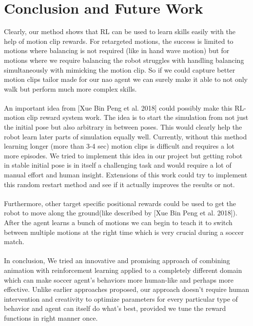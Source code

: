 \chapter{Conclusion and Future Work}

Clearly, our method shows that RL can be used to learn skills easily with the help of motion clip rewards.
For retargeted motions, the success is limited to motions where balancing is not required (like in hand wave motion) but for motions where we require balancing the robot struggles with handling balancing simultaneously with mimicking the motion clip. So if we could capture better motion clips tailor made for our nao agent we can surely make it able to not only walk but perform much more complex skills. 
\\\\
An important idea from [Xue Bin Peng et al. 2018] \cite{Peng:2018:DED:3197517.3201311} could possibly make this RL-motion clip reward system work. The idea is to start the simulation from not just the initial pose but also arbitrary in between poses. This would clearly help the robot learn later parts of simulation equally well. Currently, without this method learning longer (more than 3-4 sec) motion clips is difficult and requires a lot more episodes. We tried to implement this idea in our project but getting robot in stable initial pose is in itself a challenging task and would require a lot of manual effort and human insight. Extensions of this work could try to implement this random restart method and see if it actually improves the results or not.
\\\\
Furthermore, other target specific positional rewards could be used to get the robot to move along the ground(like described by [Xue Bin Peng et al. 2018]\cite{Peng:2018:DED:3197517.3201311}). After the agent learns a bunch of motions we can begin to teach it to switch between multiple motions at the right time which is very crucial during a soccer match.
\\\\
In conclusion, We tried an innovative and promising approach of combining animation with reinforcement learning applied to a completely different domain which can make soccer agent's behaviors more human-like and perhaps more effective. Unlike earlier approaches proposed, our approach doesn't require human intervention and creativity to optimize parameters for every particular type of behavior and agent can itself do what's best, provided we tune the reward functions in right manner once.